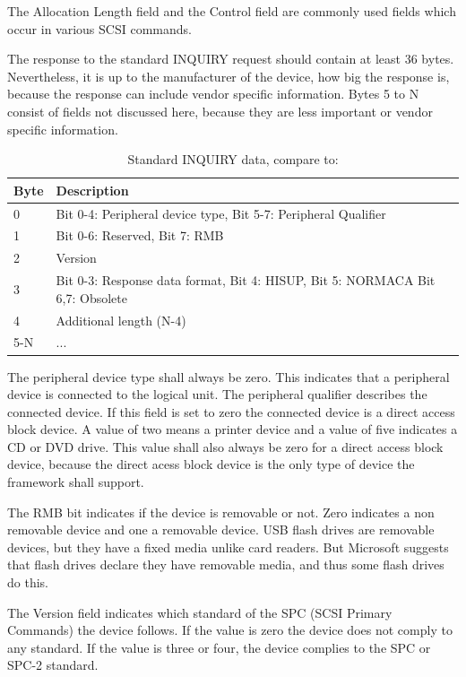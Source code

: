 The Allocation Length field and the Control field are commonly used fields which occur in various SCSI commands\cite{scsi_seagate}.

The response to the standard INQUIRY request should contain at least 36 bytes\cite{scsi_seagate}. Nevertheless, it is up to the manufacturer of the device, how big the response is, because the response can include vendor specific information\cite{scsi_seagate}. Bytes 5 to N consist of fields not discussed here, because they are less important or vendor specific information.

\begin{table}[ht]
\caption{Standard INQUIRY data, compare to: \cite{usb_ms_jan, scsi_seagate}}
\centering
\begin{tabular}{|l|l|}
\hline\hline
\textbf{Byte} & \textbf{Description}\\ \hline
0 & Bit 0-4: Peripheral device type, Bit 5-7: Peripheral Qualifier \\ \hline
1 & Bit 0-6: Reserved, Bit 7: RMB \\ \hline
2 & Version \\ \hline
3 & Bit 0-3: Response data format, Bit 4: HISUP, Bit 5: NORMACA Bit 6,7: Obsolete \\ \hline
4 & Additional length (N-4) \\ \hline
5-N & ... \\ \hline
\end{tabular}
\label{table:inquiry_data}
\end{table}

The peripheral device type shall always be zero. This indicates that a peripheral device is connected to the logical unit. The peripheral qualifier describes the connected device. If this field is set to zero the connected device is a direct access block device. A value of two means a printer device and a value of five indicates a CD or DVD drive\cite{usb_ms_jan, scsi_seagate}. This value shall also always be zero for a direct access block device, because the direct acess block device is the only type of device the framework shall support.

The RMB bit indicates if the device is removable or not. Zero indicates a non removable device and one a removable device. USB flash drives are removable devices, but they have a fixed media unlike card readers. But Microsoft suggests that flash drives declare they have removable media, and thus some flash drives do this\cite{usb_ms_jan}.

The Version field indicates which standard of the SPC (SCSI Primary Commands) the device follows. If the value is zero the device does not comply to any standard. If the value is three or four, the device complies to the SPC or SPC-2 standard\cite{usb_ms_jan, scsi_seagate}.

